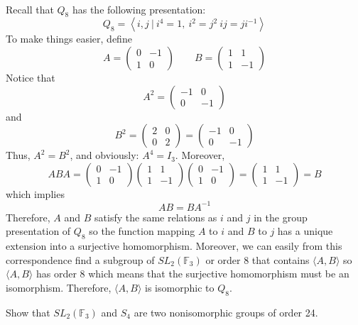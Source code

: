 \begin{solution}
    \\ Recall that $Q_8$ has the following presentation:
    $$Q_8 = \left< i,j \ | \ i^4 = 1, \ i^2 = j^2 \ ij = ji^{-1} \right>$$
    To make things easier, define 
    $$A = \begin{pmatrix} 0 & -1\\ 1 & 0 \end{pmatrix} \qquad B = \begin{pmatrix} 1 & 1\\ 1 & -1 \end{pmatrix}$$
    Notice that
    $$A^2 = \begin{pmatrix} -1 & 0\\ 0 & -1 \end{pmatrix}$$
    and 
    $$B^2 = \begin{pmatrix} 2 & 0\\ 0 & 2 \end{pmatrix} = \begin{pmatrix} -1 & 0\\ 0 & -1 \end{pmatrix}$$
    Thus, $A^2 = B^2$, and obviously: $A^4 = I_3$. Moreover, 
    $$ABA = \begin{pmatrix} 0 & -1\\ 1 & 0 \end{pmatrix} \begin{pmatrix} 1 & 1\\ 1 & -1 \end{pmatrix} \begin{pmatrix} 0 & -1\\ 1 & 0 \end{pmatrix} = \begin{pmatrix} 1 & 1\\ 1 & -1 \end{pmatrix} = B$$
    which implies 
    $$AB = BA^{-1}$$
    Therefore, $A$ and $B$ satisfy the same relations as $i$ and $j$ in the group presentation of $Q_8$ so the function mapping $A$ to $i$ and $B$ to $j$ has a unique extension into a surjective homomorphism. Moreover, we can easily from this correspondence find a subgroup of $SL_2(\mathbb{F}_3)$ or order 8 that contains $\langle A,B\rangle$ so $\langle A,B\rangle$ has order 8 which means that the surjective homomorphism must be an isomorphism. Therefore, $\langle A,B\rangle$ is isomorphic to $Q_8$. \\
\end{solution}

\begin{exercise}
    Show that $SL_2(\mathbb{F}_3)$ and $S_4$ are two nonisomorphic groups of order 24. \\
\end{exercise}

